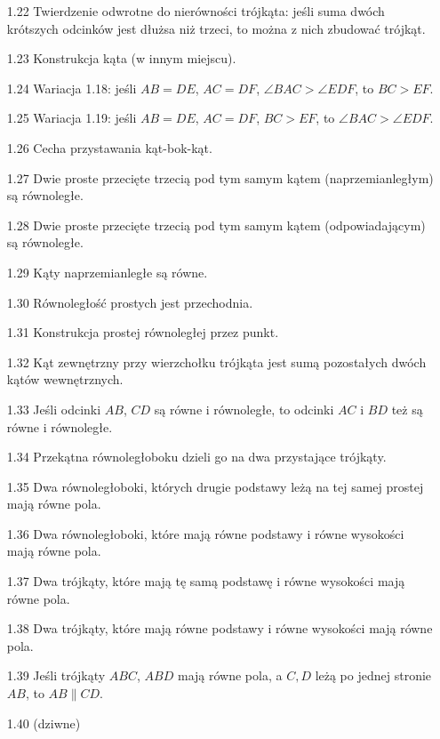 \begin{enumerate}
    \item [1.22] Twierdzenie odwrotne do nierówności trójkąta: jeśli suma dwóch krótszych odcinków jest dłużsa niż trzeci, to można z nich zbudować trójkąt. %
    \item [1.23] Konstrukcja kąta (w innym miejscu). %
    \item [1.24] Wariacja 1.18: jeśli $AB = DE$, $AC = DF$, $\angle BAC > \angle EDF$, to $BC > EF$. %
    \item [1.25] Wariacja 1.19: jeśli $AB = DE$, $AC = DF$, $BC > EF$, to $\angle BAC > \angle EDF$. %
    \item [1.26] Cecha przystawania kąt-bok-kąt. %
    \item [1.27] Dwie proste przecięte trzecią pod tym samym kątem (naprzemianległym) są równoległe. %
    \item [1.28] Dwie proste przecięte trzecią pod tym samym kątem (odpowiadającym) są równoległe. %
    \item [1.29] Kąty naprzemianległe są równe. %
    \item [1.30] Równoległość prostych jest przechodnia. %
    \item [1.31] Konstrukcja prostej równoległej przez punkt. %
    \item [1.32] Kąt zewnętrzny przy wierzchołku trójkąta jest sumą pozostałych dwóch kątów wewnętrznych. %
    \item [1.33] Jeśli odcinki $AB$, $CD$ są równe i równoległe, to odcinki $AC$ i $BD$ też są równe i równoległe. %
    \item [1.34] Przekątna równoległoboku dzieli go na dwa przystające trójkąty. %
    \item [1.35] Dwa równoległoboki, których drugie podstawy leżą na tej samej prostej mają równe pola. %
    \item [1.36] Dwa równoległoboki, które mają równe podstawy i równe wysokości mają równe pola. %
    \item [1.37] Dwa trójkąty, które mają tę samą podstawę i równe wysokości mają równe pola. %
    \item [1.38] Dwa trójkąty, które mają równe podstawy i równe wysokości mają równe pola. %
    \item [1.39] Jeśli trójkąty $ABC$, $ABD$ mają równe pola, a $C, D$ leżą po jednej stronie $AB$, to $AB \parallel CD$. %
    \item [1.40] (dziwne) %

\end{enumerate}
